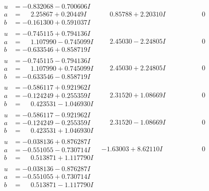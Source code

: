 \documentclass[1p]{elsarticle_modified}
\theoremstyle{definition}
\begin{document}
$$\begin{array}{c|c|c}
\begin{aligned}
u &= -0.832068 - 0.700606 I \\
a &= \phantom{-}2.25867 + 0.20449 I \\
b &= -0.161300 + 0.591037 I\end{aligned}
 & \phantom{-}0.85788 + 2.20310 I & \phantom{-0.000000 } 0 \\ \hline\begin{aligned}
u &= -0.745115 + 0.794136 I \\
a &= \phantom{-}1.107990 - 0.745099 I \\
b &= -0.633546 + 0.858719 I\end{aligned}
 & \phantom{-}2.45030 - 2.24805 I & \phantom{-0.000000 } 0 \\ \hline\begin{aligned}
u &= -0.745115 - 0.794136 I \\
a &= \phantom{-}1.107990 + 0.745099 I \\
b &= -0.633546 - 0.858719 I\end{aligned}
 & \phantom{-}2.45030 + 2.24805 I & \phantom{-0.000000 } 0 \\ \hline\begin{aligned}
u &= -0.586117 + 0.921962 I \\
a &= -0.124249 + 0.255359 I \\
b &= \phantom{-}0.423531 - 1.046930 I\end{aligned}
 & \phantom{-}2.31520 + 1.08669 I & \phantom{-0.000000 } 0 \\ \hline\begin{aligned}
u &= -0.586117 - 0.921962 I \\
a &= -0.124249 - 0.255359 I \\
b &= \phantom{-}0.423531 + 1.046930 I\end{aligned}
 & \phantom{-}2.31520 - 1.08669 I & \phantom{-0.000000 } 0 \\ \hline\begin{aligned}
u &= -0.038136 + 0.876287 I \\
a &= -0.551055 - 0.730714 I \\
b &= \phantom{-}0.513871 + 1.117790 I\end{aligned}
 & -1.63003 + 8.62110 I & \phantom{-0.000000 } 0 \\ \hline\begin{aligned}
u &= -0.038136 - 0.876287 I \\
a &= -0.551055 + 0.730714 I \\
b &= \phantom{-}0.513871 - 1.117790 I\end{aligned}

\end{array}$$
\end{document}
